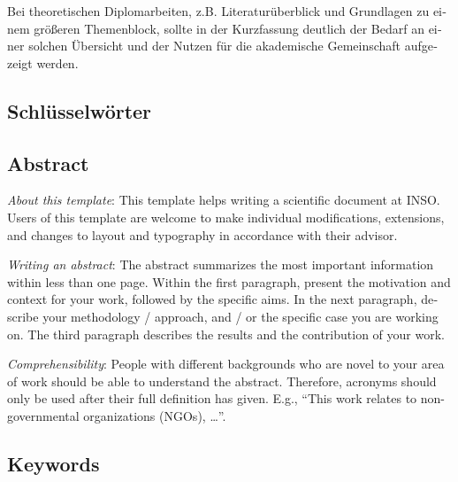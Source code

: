 \begin{otherlanguage}{ngerman}
	\makeatletter\ifthesis@masterthesis
	Bei theoretischen Diplomarbeiten, z.B. Literaturüberblick und Grundlagen zu einem größeren Themenblock, sollte in der Kurzfassung deutlich der Bedarf an einer solchen Übersicht und der Nutzen für die akademische Gemeinschaft aufgezeigt werden.
	\fi\makeatother

  \bigskip

  \section*{Schl\"usselw\"orter}

\end{otherlanguage}


\begin{otherlanguage}{english}

  \chapter*{Abstract}

  \emph{About this template}:
  This template helps writing a scientific document at INSO. Users of this template are welcome to make individual modifications, extensions, and changes to layout and typography in accordance with their advisor.

  \emph{Writing an abstract}:
  The abstract summarizes the most important information within less than one page. Within the first paragraph, present the motivation and context for your work, followed by the specific aims. In the next paragraph, describe your methodology / approach, and / or the specific case you are working on. The third paragraph describes the results and the contribution of your work.

  \emph{Comprehensibility}:
  People with different backgrounds who are novel to your area of work should be able to understand the abstract. Therefore, acronyms should only be used after their full definition has given. E.g., ``This work relates to non-governmental organizations (NGOs), \ldots''.

  \bigskip

  \section*{Keywords}

\end{otherlanguage}